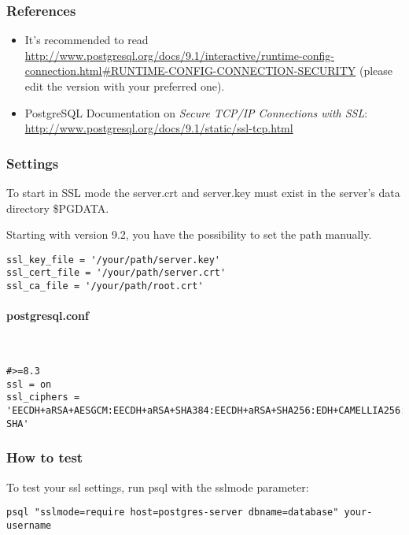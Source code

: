 \subsubsection{References}
\begin{itemize}
  \item It's recommended to read {\small \url{http://www.postgresql.org/docs/9.1/interactive/runtime-config-connection.html\#RUNTIME-CONFIG-CONNECTION-SECURITY}} (please edit the version with your preferred one).
  \item PostgreSQL Documentation on \emph{Secure TCP/IP Connections with SSL}: \url{http://www.postgresql.org/docs/9.1/static/ssl-tcp.html}
\end{itemize}


\subsubsection{Settings}
To start in SSL mode the server.crt and server.key must exist in the server's data directory \$PGDATA.

Starting with version 9.2, you have the possibility to set the path manually.

\begin{lstlisting}
ssl_key_file = '/your/path/server.key'
ssl_cert_file = '/your/path/server.crt'
ssl_ca_file = '/your/path/root.crt'
\end{lstlisting}


\paragraph*{postgresql.conf}\mbox{}\\
\begin{lstlisting}
#>=8.3
ssl = on 
ssl_ciphers = 'EECDH+aRSA+AESGCM:EECDH+aRSA+SHA384:EECDH+aRSA+SHA256:EDH+CAMELLIA256:EECDH:EDH+aRSA:+SSLv3:!aNULL:!eNULL:!LOW:!3DES:!MD5:!EXP:!PSK:!SRP:!DSS:!RC4:!SEED:!AES128:!CAMELLIA128:!ECDSA:AES256-SHA'
\end{lstlisting}


\subsubsection{How to test}
To test your ssl settings, run psql with the sslmode parameter:
\begin{lstlisting}
psql "sslmode=require host=postgres-server dbname=database" your-username
\end{lstlisting}

